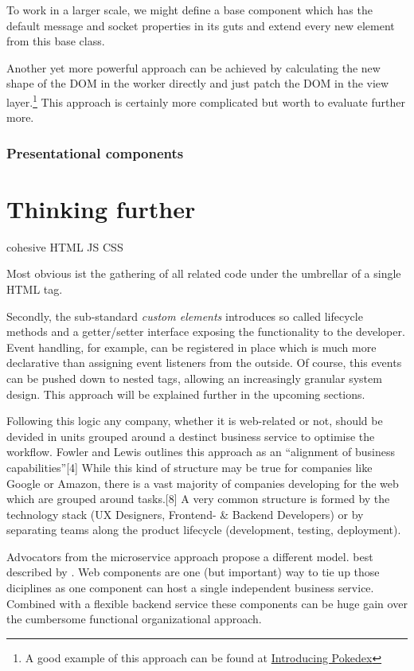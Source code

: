 \documentclass[]{article}
\begin{document}
To work in a larger scale, we might define a base component which has
the default message and socket properties in its guts and extend every
new element from this base class.

Another yet more powerful approach can be achieved by calculating the
new shape of the DOM in the worker directly and just patch the DOM in
the view layer.\footnote{A good example of this approach can be found at
  \href{http://www.pocketjavascript.com/blog/2015/11/23/introducing-pokedex-org}{Introducing
  Pokedex}} This approach is certainly more complicated but worth to
evaluate further more.

\subsubsection{Presentational
components}\label{presentational-components}

\section{Thinking further}\label{thinking-further}

cohesive HTML JS CSS

Most obvious ist the gathering of all related code under the umbrellar
of a single HTML tag.

Secondly, the sub-standard \emph{custom elements} introduces so called
lifecycle methods and a getter/setter interface exposing the
functionality to the developer. Event handling, for example, can be
registered in place which is much more declarative than assigning event
listeners from the outside. Of course, this events can be pushed down to
nested tags, allowing an increasingly granular system design. This
approach will be explained further in the upcoming sections.

Following this logic any company, whether it is web-related or not,
should be devided in units grouped around a destinct business service to
optimise the workflow. Fowler and Lewis outlines this approach as an
``alignment of business capabilities''{[}4{]} While this kind of
structure may be true for companies like Google or Amazon, there is a
vast majority of companies developing for the web which are grouped
around tasks.{[}8{]} A very common structure is formed by the technology
stack (UX Designers, Frontend- \& Backend Developers) or by separating
teams along the product lifecycle (development, testing, deployment).

Advocators from the microservice approach propose a different model.
best described by . Web components are one (but important) way to tie up
those diciplines as one component can host a single independent business
service. Combined with a flexible backend service these components can
be huge gain over the cumbersome functional organizational approach.
\end{document}
